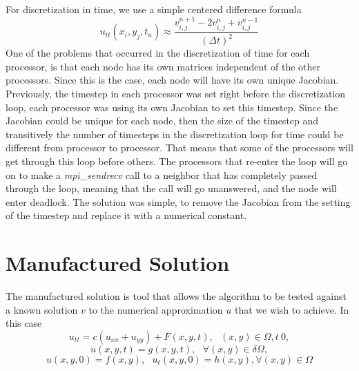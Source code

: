 \documentclass{article}
\begin{document}
For discretization in time, we use a simple centered difference formula
\[
u_{tt}(x_{i},y_{j},t_{n})\approx \frac{v_{i,j}^{n+1}-2v_{i,j}^{n}+v_{i,j}^{n-1}}{(\Delta t)^{2}}
\]
One of the problems that occurred in the discretization of time for each processor, is that each node has its own matrices independent of the other processors. Since this is the case, each node will have its own unique Jacobian. Previously, the timestep in each processor was set right before the discretization loop, each processor was using its own Jacobian to set this timestep. Since the Jacobian could be unique for each node, then the size of the timestep and transitively the number of timesteps in the discretization loop for time could be different from processor to processor. That means that some of the processors will get through this loop before others. The processors that re-enter the loop will go on to make a \textit{mpi\_sendrecv} call to a neighbor that has completely passed through the loop, meaning that the call will go unanswered, and the node will enter deadlock. The solution was simple, to remove the Jacobian from the setting of the timestep and replace it with a numerical constant.


\section{Manufactured Solution}

The manufactured solution is tool that allows the algorithm to be tested against a known solution \(v\) to the numerical approximation \(u\) that we wish to achieve. In this case
\[
u_{tt}=c(u_{xx}+u_{yy})+F(x,y,t),\text{   }(x,y)\in \Omega, t\>0,
\]
\[
u(x,y,t)=g(x,y,t),\text{   }\forall (x,y) \in \delta \Omega,
\]
\[
u(x,y,0) = f(x,y),\text{   }u_{t}(x,y,0)=h(x,y), \forall (x,y) \in \Omega
\]
\end{document}
